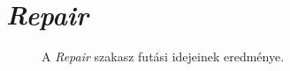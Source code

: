 
\section{\emph{Repair}}

\pagebreak
\begin{figure}[H]
	\centering
	\vspace*{-2cm}
	\label{fig:RepairResult}
	\caption{A \emph{Repair} szakasz futási idejeinek eredménye.}
\end{figure}

%